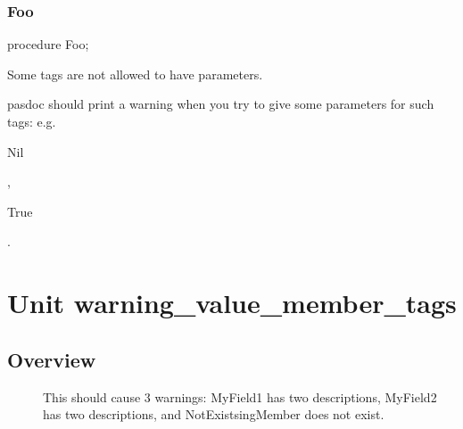 \documentclass{report}
\newif\ifpdf
\begin{document}
\subsection*{Foo}
\fi
\label{warning_tags_no_parameters-Foo}
\begin{list}{}{
\setlength{\itemindent}{0cm}
\setlength{\listparindent}{0cm}
\setlength{\leftmargin}{\evensidemargin}
\addtolength{\leftmargin}{\tmplength}
\settowidth{\labelsep}{X}
\addtolength{\leftmargin}{\labelsep}
\setlength{\labelwidth}{\tmplength}
}
\item[\textbf{Declaration}\hfill]
\ifpdf
\begin{flushleft}
\fi
\begin{ttfamily}
procedure Foo;\end{ttfamily}

\ifpdf
\end{flushleft}
\fi

\par
\item[\textbf{Description}]
Some tags are not allowed to have parameters.

pasdoc should print a warning when you try to give some parameters for such tags: e.g. \begin{ttfamily}Nil\end{ttfamily}, \begin{ttfamily}True\end{ttfamily}.

\end{list}
\chapter{Unit warning{\_}value{\_}member{\_}tags}
\label{warning_value_member_tags}
\section{Overview}
\begin{description}
\item[\texttt{\begin{ttfamily}TMyClass\end{ttfamily} Class}]

 



This should cause 3 warnings: MyField1 has two descriptions, MyField2 has two descriptions, and NotExistsingMember does not exist.
\end{description}
\end{document}
